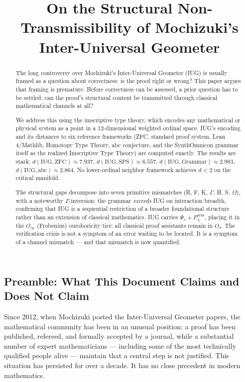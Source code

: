\documentclass[10pt,a4paper]{article}
\begin{document}
\title{On the Structural Non-Transmissibility of Mochizuki's Inter-Universal Geometer}
\date{}

\maketitle

\begin{abstract}
The long controversy over Mochizuki's Inter-Universal Geometer (IUG) is usually framed
as a question about correctness: is the proof right or wrong?
This paper argues that framing is premature.
Before correctness can be assessed, a prior question has to be settled:
can the proof's structural content be transmitted through classical mathematical channels at all?

We address this using the imscriptive type theory, which encodes any
mathematical or physical system as a point in a 12-dimensional weighted ordinal space.
IUG's encoding and its distances to six reference frameworks (ZFC, standard proof system,
Lean\,4/Mathlib, Homotopy Type Theory, abc conjecture, and the SynthOmnicon grammar itself
as the realized Imscriptive Type Theory) are computed exactly.
The results are stark: $d(\text{IUG}, \text{ZFC}) \approx 7.937$,
$d(\text{IUG}, \text{SPS}) \approx 6.557$, $d(\text{IUG}, \text{Grammar}) \approx 2.983$,
$d(\text{IUG}, \text{abc}) \approx 2.864$.
No lower-ordinal neighbor framework achieves $d < 2$ on the critical manifold.

The structural gaps decompose into seven primitive mismatches (R, F, K, $\Gamma$, H, S, $\Omega$),
with a noteworthy $\Gamma$-inversion: the grammar \emph{exceeds} IUG on interaction breadth,
confirming that IUG is a sequential restriction of a broader foundational structure rather
than an extension of classical mathematics.
IUG carries $\Phi_c + P_{\pm}^{\text{sym}}$, placing it in the $O_\infty$ (Frobenius)
ouroboricity tier; all classical proof assistants remain in $O₀$.
The verification crisis is not a symptom of an error waiting to be located.
It is a symptom of a channel mismatch --- and that mismatch is now quantified.
\end{abstract}

\subsection{Preamble: What This Document Claims and Does Not Claim}

Since 2012, when Mochizuki posted the Inter-Universal Geometer papers, the mathematical
community has been in an unusual position: a proof has been published, refereed, and
formally accepted by a journal, while a substantial number of expert mathematicians
--- including some of the most technically qualified people alive --- maintain that a
central step is not justified.
This situation has persisted for over a decade.
It has no close precedent in modern mathematics.
\end{document}
